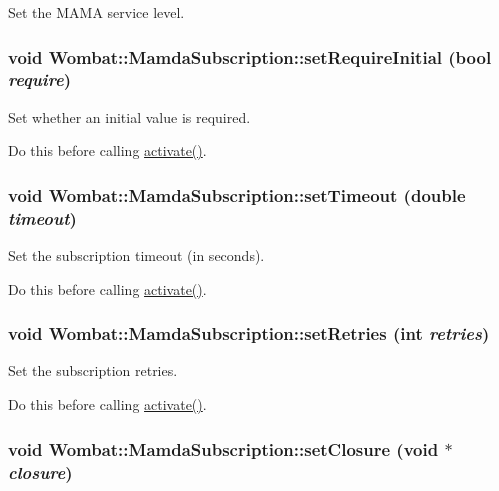 Set the MAMA service level. 

\hypertarget{classWombat_1_1MamdaSubscription_ded07ab7267ffb979524243134625b72}{
\subsubsection[setRequireInitial]{\setlength{\rightskip}{0pt plus 5cm}void Wombat::Mamda\-Subscription::set\-Require\-Initial (bool {\em require})}}
\label{classWombat_1_1MamdaSubscription_ded07ab7267ffb979524243134625b72}


Set whether an initial value is required. 

Do this before calling \hyperlink{classWombat_1_1MamdaSubscription_50f691571f680c77ad949f5c162afe35}{activate()}. \hypertarget{classWombat_1_1MamdaSubscription_72993f4d6d450f0bd6ccac8d8268eda9}{
\subsubsection[setTimeout]{\setlength{\rightskip}{0pt plus 5cm}void Wombat::Mamda\-Subscription::set\-Timeout (double {\em timeout})}}
\label{classWombat_1_1MamdaSubscription_72993f4d6d450f0bd6ccac8d8268eda9}


Set the subscription timeout (in seconds). 

Do this before calling \hyperlink{classWombat_1_1MamdaSubscription_50f691571f680c77ad949f5c162afe35}{activate()}. \hypertarget{classWombat_1_1MamdaSubscription_71be342e2ed8e1c561764618e84c441d}{
\subsubsection[setRetries]{\setlength{\rightskip}{0pt plus 5cm}void Wombat::Mamda\-Subscription::set\-Retries (int {\em retries})}}
\label{classWombat_1_1MamdaSubscription_71be342e2ed8e1c561764618e84c441d}


Set the subscription retries. 

Do this before calling \hyperlink{classWombat_1_1MamdaSubscription_50f691571f680c77ad949f5c162afe35}{activate()}. \hypertarget{classWombat_1_1MamdaSubscription_e77b32a93840085a0b828e26b6159c77}{
\subsubsection[setClosure]{\setlength{\rightskip}{0pt plus 5cm}void Wombat::Mamda\-Subscription::set\-Closure (void $\ast$ {\em closure})}}
\label{classWombat_1_1MamdaSubscription_e77b32a93840085a0b828e26b6159c77}


